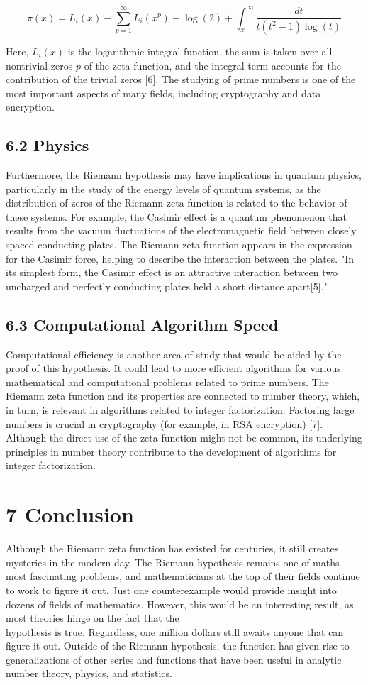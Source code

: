 \documentclass[10pt]{article}
\begin{document}
$$
\pi(x)=L_{i}(x)-\sum_{p=1}^{\infty} L_{i}\left(x^{p}\right)-\log (2)+\int_{x}^{\infty} \frac{d t}{t\left(t^{2}-1\right) \log (t)}
$$

Here, $L_{i}(x)$ is the logarithmic integral function, the sum is taken over all nontrivial zeros $p$ of the zeta function, and the integral term accounts for the contribution of the trivial zeros [6]. The studying of prime numbers is one of the most important aspects of many fields, including cryptography and data encryption.

\subsection*{6.2 Physics}
Furthermore, the Riemann hypothesis may have implications in quantum physics, particularly in the study of the energy levels of quantum systems, as the distribution of zeros of the Riemann zeta function is related to the behavior of these systems. For example, the Casimir effect is a quantum phenomenon that results from the vacuum fluctuations of the electromagnetic field between closely spaced conducting plates. The Riemann zeta function appears in the expression for the Casimir force, helping to describe the interaction between the plates. "In its simplest form, the Casimir effect is an attractive interaction between two uncharged and perfectly conducting plates held a short distance apart[5]."

\subsection*{6.3 Computational Algorithm Speed}
Computational efficiency is another area of study that would be aided by the proof of this hypothesis. It could lead to more efficient algorithms for various mathematical and computational problems related to prime numbers. The Riemann zeta function and its properties are connected to number theory, which, in turn, is relevant in algorithms related to integer factorization. Factoring large numbers is crucial in cryptography (for example, in RSA encryption) [7]. Although the direct use of the zeta function might not be common, its underlying principles in number theory contribute to the development of algorithms for integer factorization.

\section*{7 Conclusion}
Although the Riemann zeta function has existed for centuries, it still creates mysteries in the modern day. The Riemann hypothesis remains one of maths most fascinating problems, and mathematicians at the top of their fields continue to work to figure it out. Just one counterexample would provide insight into dozens of fields of mathematics. However, this would be an interesting result, as most theories hinge on the fact that the\\
hypothesis is true. Regardless, one million dollars still awaits anyone that can figure it out. Outside of the Riemann hypothesis, the function has given rise to generalizations of other series and functions that have been useful in analytic number theory, physics, and statistics.
\end{document}
